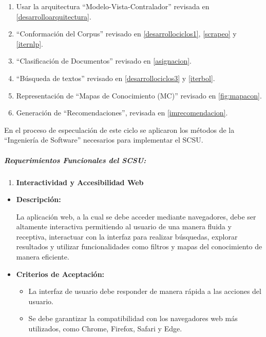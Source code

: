 \documentclass[
  12pt,
  openany]{book}
\providecommand{\tightlist}{%
  \setlength{\itemsep}{0pt}\setlength{\parskip}{0pt}}
\begin{document}
\begin{enumerate}
\def\labelenumi{\arabic{enumi}.}
\item
  Usar la arquitectura ``Modelo-Vista-Contralador'' revisada en \ref{desarrolloarquitectura}.
\item
  ``Conformación del Corpus'' revisado en \ref{desarrollociclos1}, \ref{scrapeo} y \ref{iternlp}.
\item
  ``Clasificación de Documentos'' revisado en \ref{asignacion}.
\item
  ``Búsqueda de textos'' revisado en \ref{desarrollociclos3} y \ref{iterbol}.
\item
  Representación de ``Mapas de Conocimiento (MC)'' revisado en \ref{fig:mapacon}.
\item
  Generación de ``Recomendaciones'', revisada en \ref{imrecomendacion}.
\end{enumerate}

En el proceso de especulación de este ciclo se aplicaron los métodos de la ``Ingeniería de Software'' necesarios para implementar el SCSU.

\hypertarget{requerimientos-funcionales-del-scsu}{%
\subparagraph{\texorpdfstring{\textbf{Requerimientos Funcionales del SCSU:}}{Requerimientos Funcionales del SCSU:}}\label{requerimientos-funcionales-del-scsu}}

\begin{enumerate}
\def\labelenumi{\arabic{enumi}.}
\tightlist
\item
  \textbf{Interactividad y Accesibilidad Web}
\end{enumerate}

\begin{itemize}
\item
  \textbf{Descripción:}

  La aplicación web, a la cual se debe acceder mediante navegadores, debe ser altamente interactiva permitiendo al usuario de una manera fluida y receptiva, interactuar con la interfaz para realizar búsquedas, explorar resultados y utilizar funcionalidades como filtros y mapas del conocimiento de manera eficiente.
\item
  \textbf{Criterios de Aceptación:}

  \begin{itemize}
  \tightlist
  \item
    La interfaz de usuario debe responder de manera rápida a las acciones del usuario.
  \item
    Se debe garantizar la compatibilidad con los navegadores web más utilizados, como Chrome, Firefox, Safari y Edge.
  \end{itemize}
\end{itemize}
\end{document}

